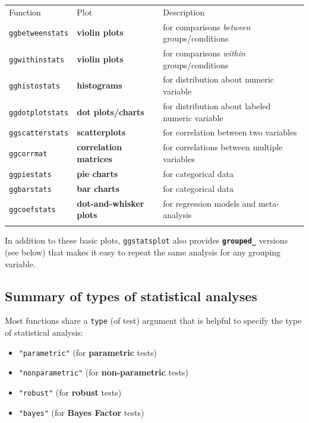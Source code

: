 \documentclass[
]{article}
\providecommand{\tightlist}{%
  \setlength{\itemsep}{0pt}\setlength{\parskip}{0pt}}
\begin{document}
\begin{longtable}[]{@{}
  >{\raggedright\arraybackslash}p{}
  >{\raggedright\arraybackslash}p{}
  >{\raggedright\arraybackslash}p{}@{}}
\toprule
Function & Plot & Description \\ \addlinespace
\midrule
\endhead
\texttt{ggbetweenstats} & \textbf{violin plots} & for comparisons \emph{between} groups/conditions \\ \addlinespace
\texttt{ggwithinstats} & \textbf{violin plots} & for comparisons \emph{within} groups/conditions \\ \addlinespace
\texttt{gghistostats} & \textbf{histograms} & for distribution about numeric variable \\ \addlinespace
\texttt{ggdotplotstats} & \textbf{dot plots/charts} & for distribution about labeled numeric variable \\ \addlinespace
\texttt{ggscatterstats} & \textbf{scatterplots} & for correlation between two variables \\ \addlinespace
\texttt{ggcorrmat} & \textbf{correlation matrices} & for correlations between multiple variables \\ \addlinespace
\texttt{ggpiestats} & \textbf{pie charts} & for categorical data \\ \addlinespace
\texttt{ggbarstats} & \textbf{bar charts} & for categorical data \\ \addlinespace
\texttt{ggcoefstats} & \textbf{dot-and-whisker plots} & for regression models and meta-analysis \\ \addlinespace
\bottomrule
\end{longtable}

In addition to these basic plots, \texttt{ggstatsplot} also provides \textbf{\texttt{grouped\_}}
versions (see below) that makes it easy to repeat the same analysis for
any grouping variable.

\hypertarget{summary-of-types-of-statistical-analyses}{%
\subsection{Summary of types of statistical analyses}\label{summary-of-types-of-statistical-analyses}}

Most functions share a \texttt{type} (of test) argument that is helpful to specify the
type of statistical analysis:

\begin{itemize}
\tightlist
\item
  \texttt{"parametric"} (for \textbf{parametric} tests)
\item
  \texttt{"nonparametric"} (for \textbf{non-parametric} tests)
\item
  \texttt{"robust"} (for \textbf{robust} tests)
\item
  \texttt{"bayes"} (for \textbf{Bayes Factor} tests)
\end{itemize}
\end{document}
